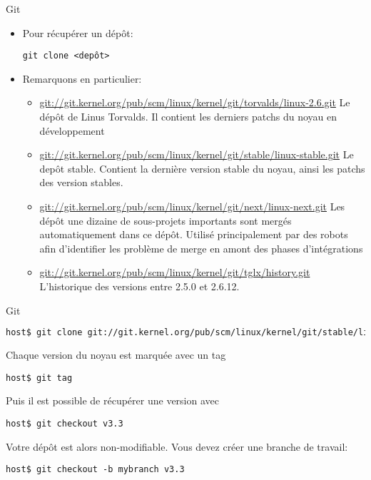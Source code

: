 \begin{frame}[fragile=singleslide]{Git}
  \begin{itemize} 
  \item Pour récupérer un dépôt:
    \begin{lstlisting} 
git clone <depôt>
    \end{lstlisting} 
  \item Remarquons en particulier:
    \begin{itemize} 
    \item
      \url{git://git.kernel.org/pub/scm/linux/kernel/git/torvalds/linux-2.6.git}
      Le dépôt de  Linus Torvalds. Il contient les  derniers patchs du
      noyau en développement
    \item
      \url{git://git.kernel.org/pub/scm/linux/kernel/git/stable/linux-stable.git}
      Le depôt  stable. Contient la dernière version  stable du noyau,
      ainsi les patchs des version stables.
    \item
      \url{git://git.kernel.org/pub/scm/linux/kernel/git/next/linux-next.git}
      Les  dépôt une  dizaine  de sous-projets  importants sont  mergés
      automatiquement dans  ce dépôt.  Utilisé  principalement par des
      robots afin  d'identifier les problème  de merge en  amont des
      phases d'intégrations
    \item
      \url{git://git.kernel.org/pub/scm/linux/kernel/git/tglx/history.git}
      L'historique des versions entre 2.5.0 et 2.6.12.
    \end{itemize} 
  \end{itemize}
\end{frame}

\begin{frame}[fragile=singleslide]{Git}
  \begin{lstlisting}[language=sh]
host$ git clone git://git.kernel.org/pub/scm/linux/kernel/git/stable/linux-stable.git
  \end{lstlisting} 
  Chaque version du noyau est marquée avec un tag
  \begin{lstlisting} 
host$ git tag
  \end{lstlisting} 
  Puis il est possible de récupérer une version avec
  \begin{lstlisting}
host$ git checkout v3.3
  \end{lstlisting}
  Votre dépôt est alors  non-modifiable.  Vous devez créer une branche
  de travail:
  \begin{lstlisting}
host$ git checkout -b mybranch v3.3
  \end{lstlisting}
\end{frame}

